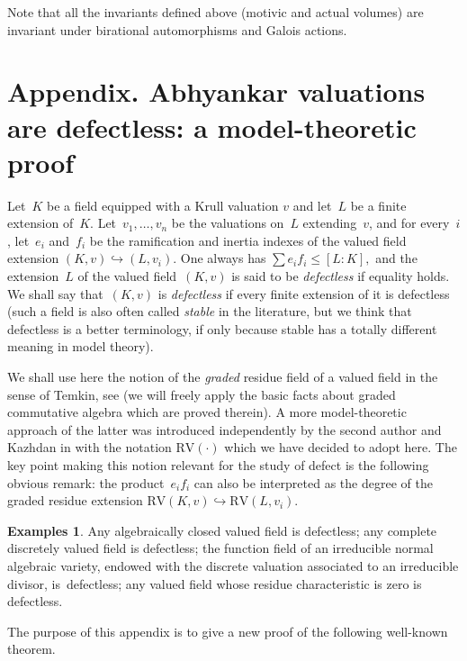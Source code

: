 \documentclass[JEP,XML,SOM,Unicode,ThmDefs,NoEqCountersInSection,published]{cedram}
\theoremstyle{plain}
\theoremstyle{definition}
\newtheorem*{Examples*}{Examples}
\begin{document}
\begin{rema}Note that all the invariants defined above (motivic and actual volumes) are invariant
under birational automorphisms and Galois actions.
\end{rema}

\appendix
{}
\section*{Appendix. Abhyankar valuations are defectless: a model-theoretic proof}\label{app:abh}

Let~$K$ be a field equipped with a Krull valuation $v$ and let~$L$ be a finite extension of~$K$. Let~$v _1,\ldots, v_n$
be the valuations on~$L$ extending~$v$, and for every~$i$, let~$e_i$ and~$f_i$ be the ramification and inertia indexes
of the valued field extension $(K,v)\hookrightarrow (L,v_i)$. One always has
$\sum e_if_i\leqslant [L:K],$ and the extension~$L$ of the valued field~$(K,v)$ is said to be {\em defectless}
if equality holds. We shall say that~$(K,v)$ is {\em defectless}
if every finite extension of it is defectless (such a field is also often called \textit{stable} in the literature,
but we think that defectless is a better terminology, if only because stable has a totally different meaning in model theory).

We shall use here the notion of the \textit{graded}
residue field of a valued field in the sense of Temkin,
see
\cite{temkin2004} (we will freely apply the basic facts about
graded commutative algebra which are proved therein). A more model-theoretic approach of the latter was
introduced independently by the second
author and Kazhdan in \cite{HK}
with the notation $\mathrm {RV(\cdot)}$ which we have decided
to adopt here.
The key point making this notion
relevant for the study of defect
is the following obvious remark: the product~$e_if_i$ can also be interpreted as the degree of
the graded
residue extension
$\mathrm{RV}(K,v)\hookrightarrow \mathrm{RV}(L,v_i)$.

\begin{Examples*}
Any algebraically closed valued field is defectless; any complete discretely valued field is
defectless;
the function field of an irreducible normal algebraic variety, endowed with the discrete valuation associated to
an irreducible divisor, is~defectless; any valued field
whose residue characteristic is zero is defectless.
\end{Examples*}

The purpose of this appendix is to give a new proof of the following well-known theorem.
\end{document}
